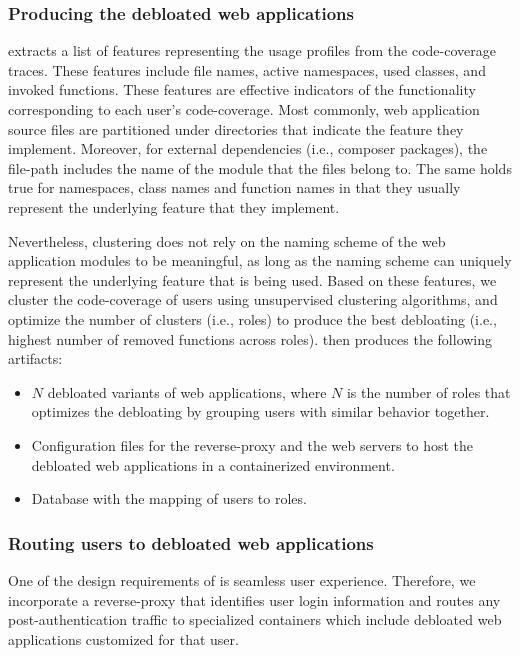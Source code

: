\subsubsection{Producing the debloated web applications}

\dbltr{} extracts a list of features representing the usage profiles from the code-coverage traces. 
These features include file names, active namespaces, used classes, and invoked functions.  
These features are effective indicators of the functionality corresponding to each user's code-coverage. 
Most commonly, web application source files are partitioned under directories that indicate the feature they implement. 
Moreover, for external dependencies (i.e., composer packages), the file-path includes the name of the module that the files belong to. 
The same holds true for namespaces, class names and function names in that they usually represent the underlying feature that they implement. 

Nevertheless, \dbltr{} clustering does not rely on the naming scheme of the web application modules to be meaningful, as long as the naming scheme can uniquely represent the underlying feature that is being used. 
Based on these features, we cluster the code-coverage of users using unsupervised clustering algorithms, and optimize the number of clusters (i.e., roles) to produce the best debloating (i.e., highest number of removed functions across roles). 
\dbltr{} then produces the following artifacts:

\begin{itemize}
    \item $N$ debloated variants of web applications, where $N$ is the number of roles that optimizes the debloating by grouping users with similar behavior together. 
    \item Configuration files for the reverse-proxy and the web servers to host the debloated web applications in a containerized environment. 
    \item Database with the mapping of users to roles.
\end{itemize}

\subsubsection{Routing users to debloated web applications}

One of the design requirements of \dbltr{} is seamless user experience. 
Therefore, we incorporate a reverse-proxy that identifies user login information and routes any post-authentication traffic to specialized containers which include debloated web applications customized for that user. 

